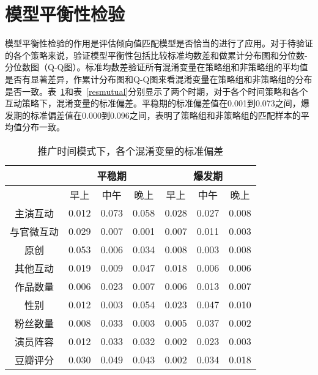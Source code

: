 \section{模型平衡性检验}

模型平衡性检验的作用是评估倾向值匹配模型是否恰当的进行了应用。对于待验证的各个策略来说，验证模型平衡性包括比较标准均数差和做累计分布图和分位数-分位数图（Q-Q图）。标准均数差验证所有混淆变量在策略组和非策略组的平均值是否有显著差异，作累计分布图和Q-Q图来看混淆变量在策略组和非策略组的分布是否一致。表~\ref{res3}和表~\ref{resmutual}分别显示了两个时期，对于各个时间策略和各个互动策略下，混淆变量的标准偏差。平稳期的标准偏差值在0.001到0.073之间，爆发期的标准偏差值在0.000到0.096之间，表明了策略组和非策略组的匹配样本的平均值分布一致。

\begin{table}[!htbp]
\centering
\caption{推广时间模式下，各个混淆变量的标准偏差}
\label{res3}
\begin{tabular}{|c|c|c|c|c|c|c|} \hline
&\multicolumn{3}{c|}{平稳期}& \multicolumn{3}{c|}{爆发期}\\ \hline
&早上&中午& 晚上 &早上&中午& 晚上\\ \hline
主演互动&0.012&0.073& 0.058&0.028&0.027& 0.008\\ \hline
与官微互动&0.029&0.007& 0.001&0.007&0.011& 0.003 \\ \hline
原创&0.053&0.006& 0.034&0.008&0.003& 0.008\\ \hline
其他互动&0.019&0.009& 0.047&0.018&0.006& 0.006\\ \hline
作品数量&0.006&0.023& 0.007&0.006&0.013& 0.007\\ \hline
性别&0.012&0.003& 0.054&0.023&0.047& 0.010\\ \hline
粉丝数量&0.008&0.033& 0.003&0.005&0.037& 0.002\\ \hline
演员阵容&0.012&0.033& 0.032&0.002&0.023& 0.003\\ \hline
豆瓣评分&0.030&0.049& 0.043&0.002&0.034&0.018\\ \hline
\end{tabular}
\end{table}

